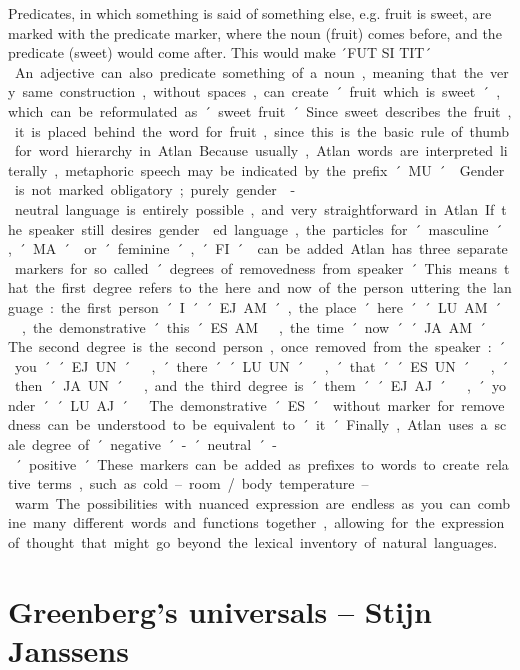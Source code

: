 Predicates, in which something is said of something else, e.g. fruit is sweet, are marked with the predicate marker, where the noun (fruit) comes before, and the predicate (sweet) would come after. This would make ´FUT SI TIT´ \fut  \si  \tit. An adjective can also predicate something of a noun, meaning that the very same construction, without spaces, can create ´fruit which is sweet´, which can be reformulated as ´sweet fruit´. Since sweet describes the fruit, it is placed behind the word for fruit, since this is the basic rule of thumb for word hierarchy in Atlan. 

Because usually, Atlan words are interpreted literally, metaphoric speech may be indicated by the prefix ´MU´ \Atlanmu. 

Gender is not marked obligatory; purely gender-neutral language is entirely possible, and very straightforward in Atlan. If the speaker still desires gendered language, the particles for ´masculine´, ´MA´ \ma or ´feminine´, ´FI´ \Atlanfi can be added. 

Atlan has three separate markers for so called ´degrees of removedness from speaker´. This means that the first degree refers to the here and now of the person uttering the language: the first person ´I´ ´EJ.AM´, the place ´here´ ´LU.AM´ \lu \am, the demonstrative ´this´ ES.AM \es \am, the time ´now´ ´JA.AM´ \ja \am. The second degree is the second person, once removed from the speaker: ´you´ ´EJ.UN´ \ej \un, ´there´ ´LU.UN´ \lu \un, ´that´ ´ES.UN´ \es \un, ´then´ JA.UN´ \ja \un, and the third degree is ´them´ ´EJ.AJ´ \ej \aj, ´yonder´ ´LU.AJ´ \lu \aj. The demonstrative ´ES´ \es without marker for removedness can be understood to be equivalent to ´it´.  

Finally, Atlan uses a scale degree of ´negative´ - ´neutral´ - ´positive´. These markers can be added as prefixes to words to create relative terms, such as cold – room / body temperature – warm. The possibilities with nuanced expression are endless as you can combine many different words and functions together, allowing for the expression of thought that might go beyond the lexical inventory of natural languages. 

\section{Greenberg's universals  -- {\small Stijn Janssens}}

